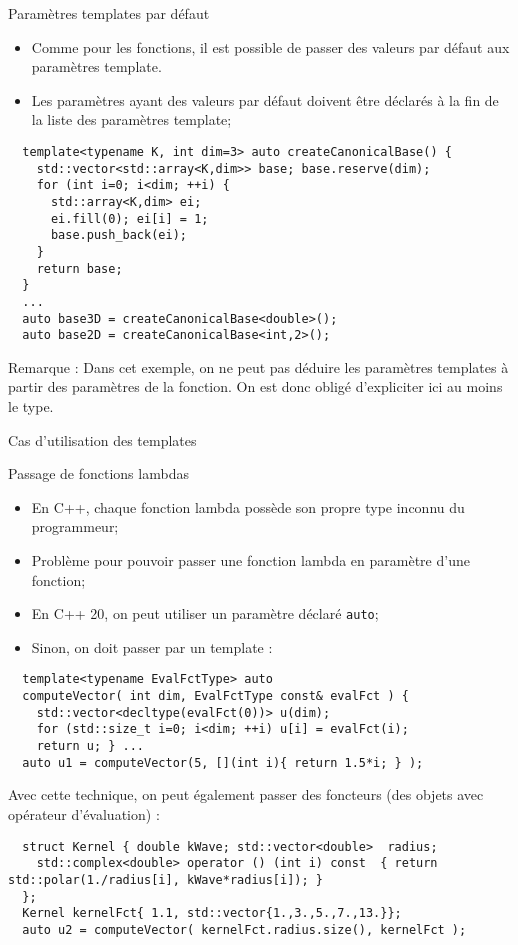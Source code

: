 \documentclass[compress,10pt,aspectratio=169]{beamer}
\begin{document}
  \begin{frame}[fragile]{Paramètres templates par défaut}
  \scriptsize
  
  \begin{itemize}
  \item Comme pour les fonctions, il est possible de passer des valeurs par défaut aux paramètres template.
  \item Les paramètres ayant des valeurs par défaut doivent être déclarés à la fin de la liste des paramètres template;
  \end{itemize}
  \begin{verbatim}
  template<typename K, int dim=3> auto createCanonicalBase() {
    std::vector<std::array<K,dim>> base; base.reserve(dim);
    for (int i=0; i<dim; ++i) {
      std::array<K,dim> ei;
      ei.fill(0); ei[i] = 1;
      base.push_back(ei);
    }
    return base;
  }
  ... 
  auto base3D = createCanonicalBase<double>();
  auto base2D = createCanonicalBase<int,2>();
  \end{verbatim}
  \alert{Remarque} : Dans cet exemple, 
                     on ne peut pas déduire les paramètres templates à partir des paramètres de
                     la fonction. On est donc obligé d'expliciter ici au moins le type.
\end{frame}

\begin{frame}[fragile]{Cas d'utilisation des templates}
  \scriptsize\vspace*{-4mm}
  \begin{block}{\small Passage de fonctions lambdas}
  \begin{itemize}
  \item En C++, chaque fonction lambda possède son propre type inconnu du programmeur;
  \item Problème pour pouvoir passer une fonction lambda en paramètre d'une fonction;
  \item En C++ 20, on peut utiliser un paramètre déclaré \texttt{auto};
  \item Sinon, on doit passer par un template :
  \end{itemize}
  \begin{verbatim}
  template<typename EvalFctType> auto
  computeVector( int dim, EvalFctType const& evalFct ) {
    std::vector<decltype(evalFct(0))> u(dim);
    for (std::size_t i=0; i<dim; ++i) u[i] = evalFct(i);
    return u; } ...
  auto u1 = computeVector(5, [](int i){ return 1.5*i; } );
  \end{verbatim}
  Avec cette technique, on peut également passer des foncteurs (des objets avec opérateur d'évaluation) :
  \begin{verbatim}
  struct Kernel { double kWave; std::vector<double>  radius;
    std::complex<double> operator () (int i) const  { return std::polar(1./radius[i], kWave*radius[i]); }
  };
  Kernel kernelFct{ 1.1, std::vector{1.,3.,5.,7.,13.}};
  auto u2 = computeVector( kernelFct.radius.size(), kernelFct );
  \end{verbatim}
  \end{block}
  \end{frame}
  
\end{document}
